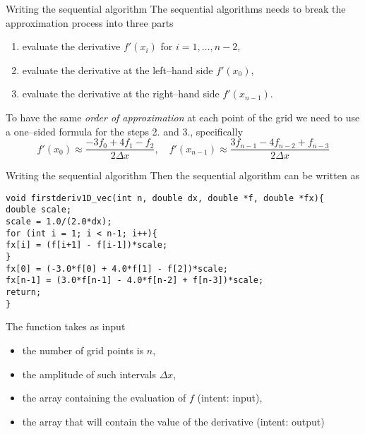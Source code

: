 \documentclass[xcolor={svgnames,usenames}]{beamer}
\begin{document}
\begin{frame}{Writing the sequential algorithm}
The sequential algorithms needs to break the approximation process into
three parts
\begin{enumerate}
\item evaluate the derivative $f'(x_i)$ for $i=1,\ldots,n-2$,
\item evaluate the derivative at the left--hand side $f'(x_0)$,
\item evaluate the derivative at the right--hand side $f'(x_{n-1})$.
\end{enumerate}
To have the same \emph{order of approximation} at each point of the grid we need to use a one--sided formula for the steps \alert{2.} and \alert{3.}, specifically
\begin{equation*}
f'(x_0) \approx \frac{-3 f_0 + 4 f_1 - f_2}{2 \Delta x}, \quad f'(x_{n-1}) \approx \frac{3f_{n-1} -4 f_{n-2} + f_{n-3}}{2 \Delta x}
\end{equation*}
\end{frame}

\begin{frame}[fragile]{Writing the sequential algorithm}
\small
Then the sequential algorithm can be written as
\begin{verbatim}
void firstderiv1D_vec(int n, double dx, double *f, double *fx){
double scale;
scale = 1.0/(2.0*dx);
for (int i = 1; i < n-1; i++){
fx[i] = (f[i+1] - f[i-1])*scale;
}
fx[0] = (-3.0*f[0] + 4.0*f[1] - f[2])*scale;
fx[n-1] = (3.0*f[n-1] - 4.0*f[n-2] + f[n-3])*scale;
return;
}
\end{verbatim}
The function takes as input
\begin{itemize}
\item the number of grid points is $n$,
\item the amplitude of such intervals $\Delta x$,
\item the array containing the evaluation of $f$ (intent: input),
\item the array that will contain the value of the derivative (intent: output)
\end{itemize}
\end{frame}
\end{document}
